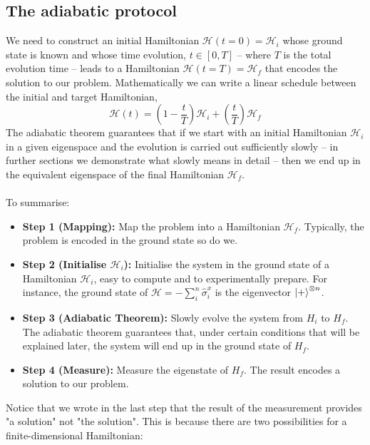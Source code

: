 \subsection{The adiabatic protocol}
We need to construct an initial Hamiltonian $\mathcal{H}(t=0) = \mathcal{H}_{i}$ whose ground state is known and whose time evolution, $t \in \left[0,T\right]$ -- where $T$ is the total evolution time -- leads to a Hamiltonian $\mathcal{H}(t=T) = \mathcal{H}_{f}$ that encodes the solution to our problem. Mathematically we can write a linear schedule between the initial and target Hamiltonian,
\begin{equation}
\label{eq:Htime}
    \mathcal{H}(t) = \left(1-\frac{t}{T}\right)\mathcal{H}_{i} + \left(\frac{t}{T} \right)\mathcal{H}_{f}
\end{equation}
The adiabatic theorem guarantees that if we start with an initial Hamiltonian $\mathcal{H}_{i}$ in a given eigenspace and the evolution is carried out sufficiently slowly -- in further sections we demonstrate what slowly means in detail -- then we end up in the equivalent eigenspace of the final Hamiltonian $\mathcal{H}_{f}$. \\\\
To summarise:
\begin{itemize}
    \item \textbf{Step 1 (Mapping):} Map the problem into a Hamiltonian $\mathcal{H}_{f}$. Typically, the problem is encoded in the ground state so do we.
    \item \textbf{Step 2 (Initialise $\mathcal{H}_{i}$):} Initialise the system in the ground state of a Hamiltonian $\mathcal{H}_{i}$, easy to compute and to experimentally prepare. For instance, the ground state of $\mathcal{H} = - \sum_{i}^{n}\hat{\sigma}_{i}^{x}$ is the eigenvector $\ket{+}^{\otimes n}$.
    \item \textbf{Step 3 (Adiabatic Theorem):} Slowly evolve the system from $H_{i}$ to $H_{f}$. The adiabatic theorem guarantees that, under certain conditions that will be explained later, the system will end up in the ground state of $H_{f}$.
    \item \textbf{Step 4 (Measure):} Measure the eigenstate of $H_{f}$. The result encodes a solution to our problem.
\end{itemize}
Notice that we wrote in the last step that the result of the measurement provides "a solution" not "the solution". This is because there are two possibilities for a finite-dimensional Hamiltonian:
